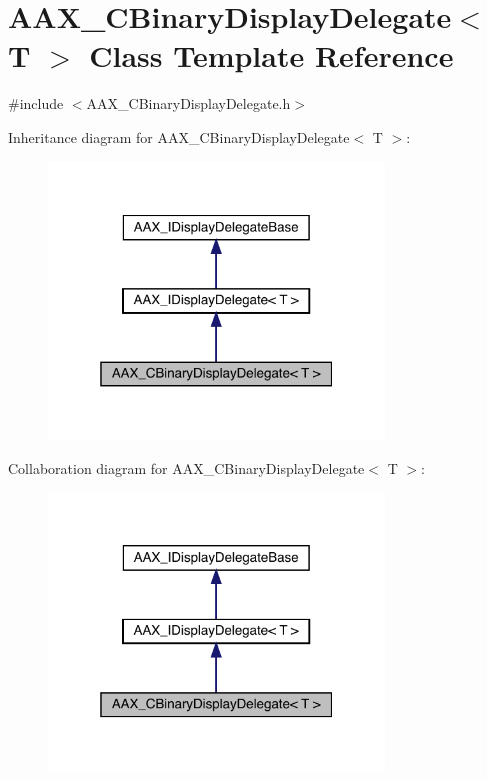 \hypertarget{a01449}{}\section{A\+A\+X\+\_\+\+C\+Binary\+Display\+Delegate$<$ T $>$ Class Template Reference}
\label{a01449}


{\ttfamily \#include $<$A\+A\+X\+\_\+\+C\+Binary\+Display\+Delegate.\+h$>$}



Inheritance diagram for A\+A\+X\+\_\+\+C\+Binary\+Display\+Delegate$<$ T $>$\+:
\nopagebreak
\begin{figure}[H]
\begin{center}
\leavevmode
\includegraphics[width=253pt]{a01448}
\end{center}
\end{figure}


Collaboration diagram for A\+A\+X\+\_\+\+C\+Binary\+Display\+Delegate$<$ T $>$\+:
\nopagebreak
\begin{figure}[H]
\begin{center}
\leavevmode
\includegraphics[width=253pt]{a01447}
\end{center}
\end{figure}


